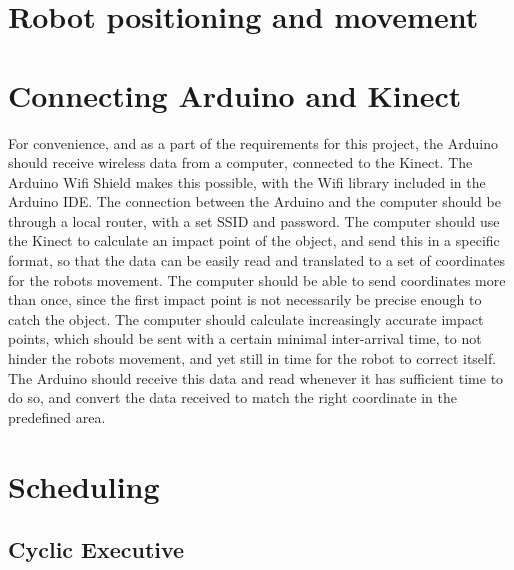 \section{Robot positioning and movement}
\label{sec:Robot positioning and movement}

\section{Connecting Arduino and Kinect}
\label{sec:Connecting Arduino and Kinect}
For convenience, and as a part of the requirements for this project, the Arduino should receive wireless data from a computer, connected to the Kinect. The Arduino Wifi Shield makes this possible, with the Wifi library included in the Arduino IDE. \newline
The connection between the Arduino and the computer should be through a local router, with a set SSID and password. The computer should use the Kinect to calculate an impact point of the object, and send this in a specific format, so that the data can be easily read and translated to a set of coordinates for the robots movement. The computer should be able to send coordinates more than once, since the first impact point is not necessarily be precise enough to catch the object. The computer should calculate increasingly accurate impact points, which should be sent with a certain minimal inter-arrival time, to not hinder the robots movement, and yet still in time for the robot to correct itself. \newline
The Arduino should receive this data and read whenever it has sufficient time to do so, and convert the data received to match the right coordinate in the predefined area. 

\section{Scheduling}
\label{sec:Scheduling}


\subsection{Cyclic Executive}
\label{sec:Cyclic Executive}

